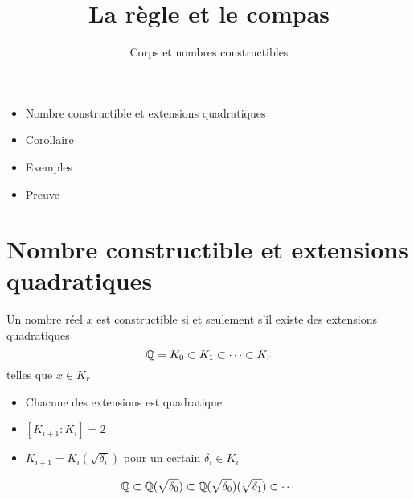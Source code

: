 


\newcommand{\construc}{\mathcal{C}}
\newcommand{\plan}{\mathcal{P}}
\newcommand{\cercle}{\mathcal{C}}
   





\title{{\bf La règle et le compas}}
\subtitle{Corps et nombres constructibles}

\begin{frame}
  
  \debutmontitre

  \pause

{\footnotesize
\hfill
{}
\begin{minipage}{0.6\textwidth}
  \begin{itemize}
    \item<3-> Nombre constructible et extensions quadratiques
    \item<4-> Corollaire
    \item<5-> Exemples
    \item<6-> Preuve
  \end{itemize}
\end{minipage}
}

\end{frame}

\setcounter{framenumber}{0}


\section{Nombre constructible et extensions quadratiques}

\begin{frame}

\begin{theoreme}[de Wantzel]
\label{th:wantzel}
Un nombre réel $x$ est constructible si et seulement s'il existe 
des extensions quadratiques 
$$\mathbb{Q} = K_0 \subset K_1 \subset \cdots \subset K_r$$
telles que $x \in K_r$
\end{theoreme}

\pause

\begin{itemize}
  \item Chacune des extensions est quadratique
\pause
  \item $[K_{i+1}:K_i]=2$
\pause
  \item $K_{i+1} = K_i(\sqrt{\delta_i})$ pour un certain $\delta_i \in K_i$ 
\end{itemize}

\pause
$$\mathbb{Q} \subset \mathbb{Q}(\sqrt{\delta_0}) \subset \mathbb{Q}(\sqrt{\delta_0})(\sqrt{\delta_1}) \subset \cdots$$
\end{frame}



